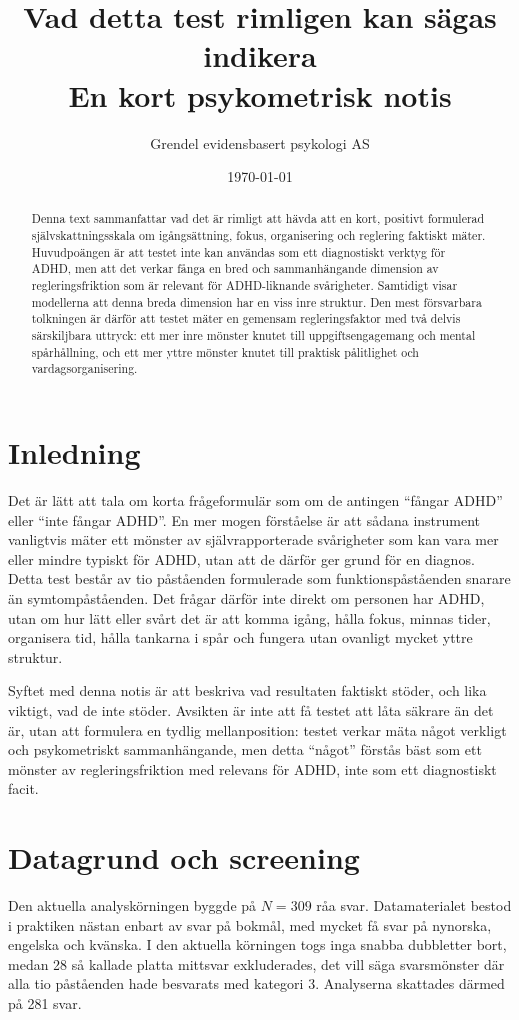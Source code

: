 \documentclass[11pt,a4paper]{article}
\title{Vad detta test rimligen kan sägas indikera\\
\large En kort psykometrisk notis}
\author{Grendel evidensbasert psykologi AS}
\date{\today}
\begin{document}
\maketitle

\begin{abstract}
Denna text sammanfattar vad det är rimligt att hävda att en kort, positivt formulerad självskattningsskala om igångsättning, fokus, organisering och reglering faktiskt mäter. Huvudpoängen är att testet inte kan användas som ett diagnostiskt verktyg för ADHD, men att det verkar fånga en bred och sammanhängande dimension av regleringsfriktion som är relevant för ADHD-liknande svårigheter. Samtidigt visar modellerna att denna breda dimension har en viss inre struktur. Den mest försvarbara tolkningen är därför att testet mäter en gemensam regleringsfaktor med två delvis särskiljbara uttryck: ett mer inre mönster knutet till uppgiftsengagemang och mental spårhållning, och ett mer yttre mönster knutet till praktisk pålitlighet och vardagsorganisering.
\end{abstract}

\section{Inledning}
Det är lätt att tala om korta frågeformulär som om de antingen ``fångar ADHD'' eller ``inte fångar ADHD''. En mer mogen förståelse är att sådana instrument vanligtvis mäter ett mönster av självrapporterade svårigheter som kan vara mer eller mindre typiskt för ADHD, utan att de därför ger grund för en diagnos. Detta test består av tio påståenden formulerade som funktionspåståenden snarare än symtompåståenden. Det frågar därför inte direkt om personen har ADHD, utan om hur lätt eller svårt det är att komma igång, hålla fokus, minnas tider, organisera tid, hålla tankarna i spår och fungera utan ovanligt mycket yttre struktur.

Syftet med denna notis är att beskriva vad resultaten faktiskt stöder, och lika viktigt, vad de inte stöder. Avsikten är inte att få testet att låta säkrare än det är, utan att formulera en tydlig mellanposition: testet verkar mäta något verkligt och psykometriskt sammanhängande, men detta ``något'' förstås bäst som ett mönster av regleringsfriktion med relevans för ADHD, inte som ett diagnostiskt facit.

\section{Datagrund och screening}
Den aktuella analyskörningen byggde på $N = 309$ råa svar. Datamaterialet bestod i praktiken nästan enbart av svar på bokmål, med mycket få svar på nynorska, engelska och kvänska. I den aktuella körningen togs inga snabba dubbletter bort, medan 28 så kallade platta mittsvar exkluderades, det vill säga svarsmönster där alla tio påståenden hade besvarats med kategori 3. Analyserna skattades därmed på 281 svar.
\end{document}
